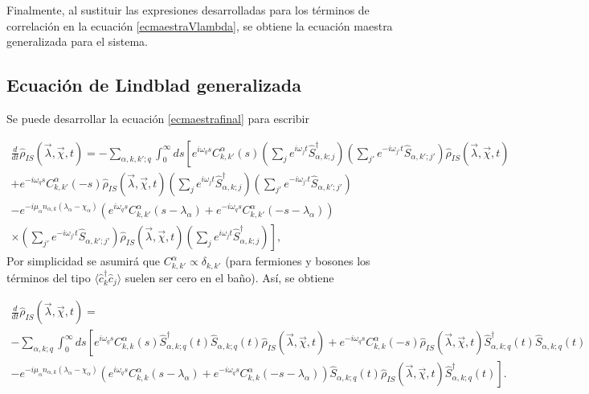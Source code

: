 \begin{appendixs}
Finalmente, al sustituir las expresiones desarrolladas para los términos de correlación en la ecuación \ref{ecmaestraVlambda}, se obtiene la ecuación maestra generalizada para el sistema.
\label{finalequation}

\newpage

\subsection{Ecuación de Lindblad generalizada}
Se puede desarrollar la ecuación \ref{ecmaestrafinal} para escribir

\begin{multline*}
    \frac{d}{dt}\hat{\rho}_{IS}(\vec{\lambda},\vec{\chi},t) = - \sum_{\alpha,k,k';q} \int_{0}^{\infty}ds \left[e^{i\omega_{q}s}C^{\alpha}_{k,k'}(s) \left(\sum_{j}e^{i\omega_{j}t}\hat{S}^{\dagger}_{\alpha,k;j} \right)\left(\sum_{j'}e^{-i\omega_{j'}t}\hat{S}_{\alpha,k';j'} \right)\hat{\rho}_{IS}(\vec{\lambda},\vec{\chi},t)  \right. \\
    \left. +  e^{-i\omega_{q}s}C^{\alpha}_{k,k'}(-s) \hat{\rho}_{IS}(\vec{\lambda},\vec{\chi},t) \left(\sum_{j}e^{i\omega_{j}t}\hat{S}^{\dagger}_{\alpha,k;j} \right)\left(\sum_{j'}e^{-i\omega_{j'}t}\hat{S}_{\alpha,k';j'} \right)\right. \\
    \left. - e^{-i\mu_{\alpha}n_{\alpha,k}(\lambda_{\alpha}-\chi_{\alpha})}(e^{i\omega_{q}s}C^{\alpha}_{k,k'}(s-\lambda_{\alpha}) + e^{-i\omega_{q}s}C^{\alpha}_{k,k'}(-s-\lambda_{\alpha}) ) \right.\\
    \left.\times \left(\sum_{j'}e^{-i\omega_{j'}t}\hat{S}_{\alpha,k';j'} \right)\hat{\rho}_{IS}(\vec{\lambda},\vec{\chi},t) \left(\sum_{j}e^{i\omega_{j}t}\hat{S}^{\dagger}_{\alpha,k;j} \right)    \right],   
\end{multline*}
Por simplicidad se asumirá que $C_{k,k'}^{\alpha} \propto \delta_{k,k'}$ (para fermiones y bosones los  términos del tipo $\langle \hat{c}^{\dagger}_{k}\hat{c}_{j}\rangle$ suelen ser cero en el baño)\cite{potts2021thermodynamically}. Así, se obtiene 

\begin{multline*}
    \frac{d}{dt}\hat{\rho}_{IS}(\vec{\lambda},\vec{\chi},t) = \\
     - \sum_{\alpha,k;q} \int_{0}^{\infty}ds \left[e^{i\omega_{q}s}C^{\alpha}_{k,k}(s) \hat{S}^{\dagger}_{\alpha,k;q}(t)\hat{S}_{\alpha,k;q}(t)\hat{\rho}_{IS}(\vec{\lambda},\vec{\chi},t)  +  e^{-i\omega_{q}s}C^{\alpha}_{k,k}(-s) \hat{\rho}_{IS}(\vec{\lambda},\vec{\chi},t) \hat{S}^{\dagger}_{\alpha,k;q}(t) \hat{S}_{\alpha,k;q}(t) \right. \\
    \left. - e^{-i\mu_{\alpha}n_{\alpha,k}(\lambda_{\alpha}-\chi_{\alpha})}(e^{i\omega_{q}s}C^{\alpha}_{k,k}(s-\lambda_{\alpha}) + e^{-i\omega_{q}s}C^{\alpha}_{k,k}(-s-\lambda_{\alpha}) ) \hat{S}_{\alpha,k;q}(t) \hat{\rho}_{IS}(\vec{\lambda},\vec{\chi},t) \hat{S}^{\dagger}_{\alpha,k;q}(t)    \right].  
\end{multline*}


\end{appendixs}
